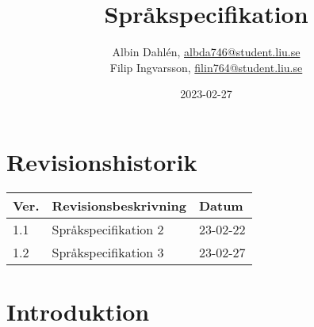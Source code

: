 \documentclass{TDP003mall}
\author{Albin Dahlén, \url{albda746@student.liu.se}\\
Filip Ingvarsson, \url{filin764@student.liu.se}}
\title{Språkspecifikation}
\date{2023-02-27}
\begin{document}
    \projectpage

    \tableofcontents

    \section*{Revisionshistorik}
    \begin{table}[!h]
        \begin{tabularx}{\linewidth}{|l|X|l|}
            \hline
            Ver. & Revisionsbeskrivning      & Datum    \\\hline
            1.1  & Språkspecifikation 2     & 23-02-22 \\\hline
            1.2  & Språkspecifikation 3     & 23-02-27 \\\hline
        \end{tabularx}
    \end{table}

    \newpage


    \section{Introduktion}
\end{document}
